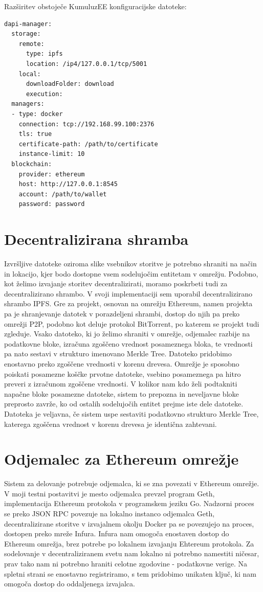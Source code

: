 \documentclass[a4paper, 12pt]{book}
\begin{document}
Razširitev obstoječe KumuluzEE konfiguracijske datoteke:

\begin{lstlisting}
dapi-manager:
  storage:
    remote:
      type: ipfs
      location: /ip4/127.0.0.1/tcp/5001
    local:
      downloadFolder: download
      execution:
  managers:
  - type: docker
    connection: tcp://192.168.99.100:2376
    tls: true
    certificate-path: /path/to/certificate
    instance-limit: 10
  blockchain:
    provider: ethereum
    host: http://127.0.0.1:8545
    account: /path/to/wallet
    password: password
\end{lstlisting}

\section{Decentralizirana shramba}
Izvršljive datoteke oziroma slike vsebnikov storitve je potrebno shraniti na način in lokacijo, kjer bodo dostopne vsem sodelujočim entitetam v omrežju.
Podobno, kot želimo izvajanje storitev decentralizirati, moramo poskrbeti tudi za decentralizirano shrambo.
V svoji implementaciji sem uporabil decentralizirano shrambo IPFS.
Gre za projekt, osnovan na omrežju Ethereum, namen projekta pa je shranjevanje datotek v porazdeljeni shrambi, dostop do njih pa preko omrežji P2P, podobno kot deluje protokol BitTorrent, po katerem se projekt tudi zgleduje.
Vsako datoteko, ki jo želimo shraniti v omrežje, odjemalec razbije na podatkovne bloke, izračuna zgoščeno vrednost posameznega bloka, te vrednosti pa nato sestavi v strukturo imenovano Merkle Tree.
Datoteko pridobimo enostavno preko zgoščene vrednosti v korenu drevesa.
Omrežje je sposobno poiskati posamezne koščke prvotne datoteke, vsebino posameznega pa hitro preveri z izračunom zgoščene vrednosti. V kolikor nam kdo želi podtakniti napačne bloke posamezne datoteke, sistem to prepozna in neveljavne bloke preprosto zavrže, ko od ostalih sodelujočih entitet prejme iste dele datoteke. Datoteka je veljavna, če sistem uspe sestaviti podatkovno strukturo Merkle Tree, katerega zgoščena vrednost v korenu drevesa je identična zahtevani. \cite{Ipfs}

\section{Odjemalec za Ethereum omrežje}
Sistem za delovanje potrebuje odjemalca, ki se zna povezati v Ethereum omrežje.
V moji testni postavitvi je mesto odjemalca prevzel program Geth, implementacija Ethereum protokola v programskem jeziku Go. \cite{Geth}
Nadzorni proces se preko JSON RPC povezuje na lokalno instanco odjemalca Geth, decentralizirane storitve v izvajalnem okolju Docker pa se 
povezujejo na proces, dostopen preko mreže Infura.
Infura nam omogoča enostaven dostop do Ethereum omrežja, brez potrebe po lokalnem izvajanju Ehtereum protokola.
Za sodelovanje v decentraliziranem svetu nam lokalno ni potrebno namestiti ničesar, prav tako nam ni potrebno hraniti
celotne zgodovine - podatkovne verige. 
Na spletni strani se enostavno registriramo, s tem pridobimo unikaten ključ, ki nam omogoča dostop do oddaljenega izvajalca. \cite{Infura}
\end{document}
